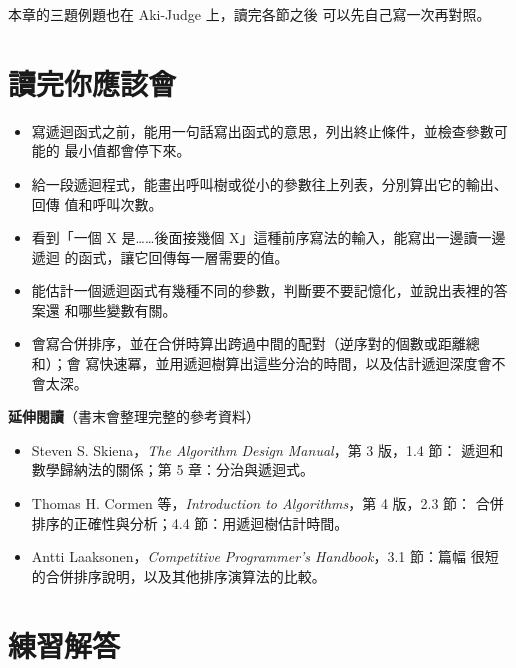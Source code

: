 本章的三題例題也在 Aki-Judge 上，讀完各節之後
可以先自己寫一次再對照。

\section{讀完你應該會}
\label{sec:ch8-checklist}

\begin{itemize}
\item 寫遞迴函式之前，能用一句話寫出函式的意思，列出終止條件，並檢查參數可能的
最小值都會停下來。
\item 給一段遞迴程式，能畫出呼叫樹或從小的參數往上列表，分別算出它的輸出、回傳
值和呼叫次數。
\item 看到「一個 X 是……後面接幾個 X」這種前序寫法的輸入，能寫出一邊讀一邊遞迴
的函式，讓它回傳每一層需要的值。
\item 能估計一個遞迴函式有幾種不同的參數，判斷要不要記憶化，並說出表裡的答案還
和哪些變數有關。
\item 會寫合併排序，並在合併時算出跨過中間的配對（逆序對的個數或距離總和）；會
寫快速冪，並用遞迴樹算出這些分治的時間，以及估計遞迴深度會不會太深。
\end{itemize}

\textbf{延伸閱讀}（書末會整理完整的參考資料）

\begin{itemize}
\item Steven S. Skiena，\textit{The Algorithm Design Manual}，第 3 版，1.4 節：
遞迴和數學歸納法的關係；第 5 章：分治與遞迴式。
\item Thomas H. Cormen 等，\textit{Introduction to Algorithms}，第 4 版，2.3 節：
合併排序的正確性與分析；4.4 節：用遞迴樹估計時間。
\item Antti Laaksonen，\textit{Competitive Programmer's Handbook}，3.1 節：篇幅
很短的合併排序說明，以及其他排序演算法的比較。
\end{itemize}

\section*{練習解答}

